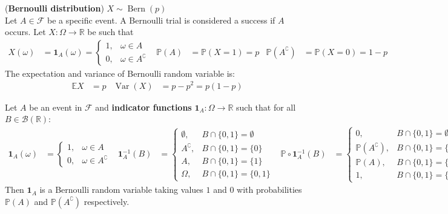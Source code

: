 \documentclass{huhtakm-template-book}
\newcommand{\prob}{\mathbb{P}}
\newcommand{\expect}{\mathbb{E}}
\DeclareMathOperator{\Bern}{Bern}
\DeclareMathOperator{\Var}{Var}
\begin{document}
\newpage
\begin{eg}(\textbf{Bernoulli distribution}) $X\sim \Bern(p)$\\
	Let $A\in\mathcal{F}$ be a specific event. A Bernoulli trial is considered a success if $A$ occurs. Let $X:\Omega\to\mathbb{R}$ be such that
	\begin{align*}
		X(\omega)&=\mathbf{1}_{A}(\omega)=\begin{cases}
			1, &\omega\in A\\
			0, &\omega\in A^{\complement}
		\end{cases} & \prob(A)&=\prob(X=1)=p & \prob(A^{\complement})&=\prob(X=0)=1-p
	\end{align*}
	The expectation and variance of Bernoulli random variable is:
	\begin{align*}
		\expect X&=p & \Var(X)&=p-p^{2}=p(1-p)
	\end{align*}
\end{eg}
\begin{eg}
	Let $A$ be an event in $\mathcal{F}$ and \textbf{indicator functions} $\mathbf{1}_{A}:\Omega\to\mathbb{R}$ such that for all $B\in\mathcal{B}(\mathbb{R})$:
	\begin{align*}
		\mathbf{1}_{A}(\omega)&=\begin{cases}
			1, &\omega\in A\\
			0, &\omega\in A^{\complement}
		\end{cases} & \mathbf{1}_{A}^{-1}(B)&=\begin{cases}
			\emptyset, &B\cap\{0,1\}=\emptyset\\
			A^{\complement}, & B\cap\{0,1\}=\{0\}\\
			A, &B\cap\{0,1\}=\{1\}\\
			\Omega, &B\cap\{0,1\}=\{0,1\}
		\end{cases} & \prob\circ \mathbf{1}_{A}^{-1}(B)&=\begin{cases}
			0, &B\cap\{0,1\}=\emptyset\\
			\prob(A^{\complement}), & B\cap\{0,1\}=\{0\}\\
			\prob(A), &B\cap\{0,1\}=\{1\}\\
			1, &B\cap\{0,1\}=\{0,1\}
		\end{cases}
	\end{align*}
	Then $\mathbf{1}_{A}$ is a Bernoulli random variable taking values $1$ and $0$ with probabilities $\prob(A)$ and $\prob(A^{\complement})$ respectively.
\end{eg}
\end{document}
